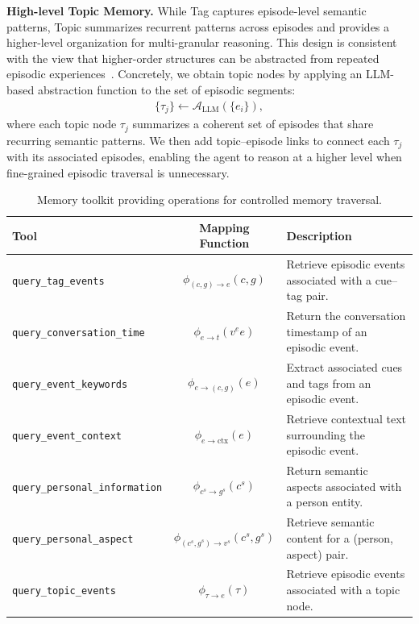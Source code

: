 \documentclass{llmxive}
\begin{document}
\textbf{High-level Topic Memory.}
While Tag captures episode-level semantic patterns, Topic summarizes recurrent patterns across episodes and provides a higher-level organization for multi-granular reasoning.
This design is consistent with the view that higher-order structures can be abstracted from repeated episodic experiences~\cite{pan2025secom, tan2025prospect}.
Concretely, we obtain topic nodes by applying an LLM-based abstraction function to the set of episodic segments:
\begin{align}
\{\tau_j\} \leftarrow \mathcal{A}_{\text{LLM}}(\{e_i\}),
\end{align}
where each topic node $\tau_j$ summarizes a coherent set of episodes that share recurring semantic patterns.
We then add topic--episode links to connect each $\tau_j$ with its associated episodes, enabling the agent to reason at a higher level when fine-grained episodic traversal is unnecessary.
\begin{table}[t]
\centering
\begin{tabular}{lcl}
\toprule
\textbf{Tool} & \textbf{Mapping Function} & \textbf{Description} \\
\midrule
\texttt{query\_tag\_events}
& $\phi_{(c,g)\rightarrow e}(c,g)$
& Retrieve episodic events associated with a cue--tag pair. \\

\texttt{query\_conversation\_time}
& $\phi_{e\rightarrow t}(v^{e}e)$
& Return the conversation timestamp of an episodic event. \\

\texttt{query\_event\_keywords}
& $\phi_{e\rightarrow (c,g)}(e)$
& Extract associated cues and tags from an episodic event. \\

\texttt{query\_event\_context}
& $\phi_{e\rightarrow \mathrm{ctx}}(e)$
& Retrieve contextual text surrounding the episodic event. \\

\texttt{query\_personal\_information}
& $\phi_{c^{s}\rightarrow g^{s}}(c^{s})$
& Return semantic aspects associated with a person entity. \\

\texttt{query\_personal\_aspect}
& $\phi_{(c^{s},g^{s})\rightarrow v^{s}}(c^{s},g^{s})$
& Retrieve semantic content for a (person, aspect) pair. \\

\texttt{query\_topic\_events}
& $\phi_{\tau\rightarrow e}(\tau)$
& Retrieve episodic events associated with a topic node. \\
\bottomrule
\end{tabular}
\label{tab:tools}
\caption{Memory toolkit providing operations for controlled memory traversal.}
\end{table}
\end{document}

